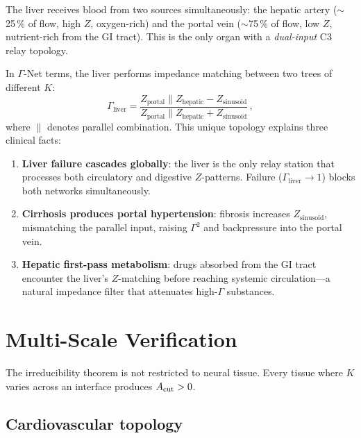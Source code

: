 \documentclass[aps,pre,twocolumn,superscriptaddress,floatfix]{revtex4-2}
\begin{document}
\begin{remark}
\label{rem:portal}
The liver receives blood from two sources
simultaneously: the hepatic artery
($\sim$25\,\% of flow, high $Z$, oxygen-rich)
and the portal vein
($\sim$75\,\% of flow, low $Z$, nutrient-rich
from the GI tract).
This is the only organ with a \emph{dual-input}
C3 relay topology.

In $\Gamma$-Net terms, the liver performs impedance
matching between two trees of different $K$:
\[
  \Gamma_{\text{liver}} =
  \frac{Z_{\text{portal}} \| Z_{\text{hepatic}}
        - Z_{\text{sinusoid}}}
       {Z_{\text{portal}} \| Z_{\text{hepatic}}
        + Z_{\text{sinusoid}}}\,,
\]
where $\|$ denotes parallel combination.
This unique topology explains three clinical facts:
\begin{enumerate}
  \item \textbf{Liver failure cascades globally}:
    the liver is the only relay station that processes
    both circulatory and digestive $Z$-patterns.
    Failure ($\Gamma_{\text{liver}} \to 1$) blocks
    both networks simultaneously.
  \item \textbf{Cirrhosis produces portal hypertension}:
    fibrosis increases $Z_{\text{sinusoid}}$,
    mismatching the parallel input, raising
    $\Gamma^2$ and backpressure into the portal vein.
  \item \textbf{Hepatic first-pass metabolism}:
    drugs absorbed from the GI tract encounter the
    liver's $Z$-matching before reaching systemic
    circulation---a natural impedance filter that
    attenuates high-$\Gamma$ substances.
\end{enumerate}
\end{remark}


\section{Multi-Scale Verification}
\label{sec:multi-scale}

The irreducibility theorem is not restricted to neural
tissue.
Every tissue where $K$ varies across an interface
produces $A_{\text{cut}} > 0$.

\subsection{Cardiovascular topology}
\end{document}
